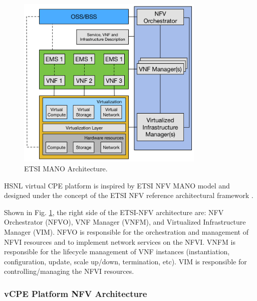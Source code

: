 \begin{figure}[!t]
\centering
\includegraphics[width=0.8\textwidth]{./fig/etsi_nfv_architecture}
\caption{ETSI MANO Architecture.}
\label{fig:etsi_nfv_architecture}
\end{figure}

HSNL virtual CPE platform \cite{che-wei-master, che-wei-umedia} is inspired by ETSI NFV MANO model and designed under the concept of the ETSI NFV reference architectural framework \cite{etsi-nfv-archi}.

Shown in Fig. \ref{fig:etsi_nfv_architecture}, the right side of the ETSI-NFV architecture are: NFV Orchestrator (NFVO), VNF Manager (VNFM), and Virtualized Infrastructure Manager (VIM). NFVO is responsible for the orchestration and management of NFVI resources and to implement network services on the NFVI. VNFM is responsible for the lifecycle management of VNF instances (instantiation, configuration, update, scale up/down, termination, etc). VIM is responsible for controlling/managing the NFVI resources.

\subsubsection{vCPE Platform NFV Architecture}

